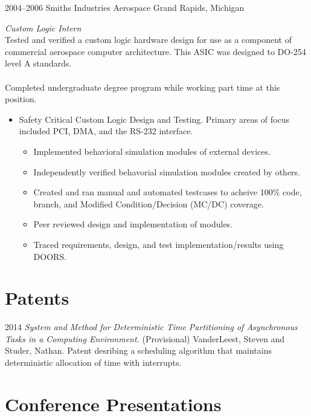\documentclass[print]{template/friggeri-cv} %
\begin{document}
\begin{entrylist}

\longentry
{2004--2006}
{Smiths Industries Aerospace}
{Grand Rapids, Michigan}
{\emph{Custom Logic Intern} \\
Tested and verified a custom logic hardware design for use as a component of commercial aerospace computer architecture.  This ASIC was designed to DO-254 level A standards.  
\\
\\
Completed undergraduate degree program while working part time at this position.
\begin{itemize}
\item Safety Critical Custom Logic Design and Testing.  Primary areas of focus included PCI, DMA, and the RS-232 interface.
\begin{itemize}
\item Implemented behavioral simulation modules of external devices.
\item Independently verified behavorial simulation modules created by others.
\item Created and ran manual and automated testcases to acheive 100\% code, branch, and Modified Condition/Decision (MC/DC) coverage.
\item Peer reviewed design and implementation of modules.
\item Traced requirements, design, and test implementation/results using DOORS.
\end{itemize}
\end{itemize}}

\end{entrylist}

\section{Patents}

\begin{entrylist}
\longentry
{2014}
{\emph{System and Method for Deterministic Time Partitioning of Asynchronous Tasks in a Computing Environment.} (Provisional)}
{VanderLeest, Steven and Studer, Nathan.}
{Patent desribing a scheduling algorithm that maintains deterministic allocation of time with interrupts.}
\end{entrylist}

\section{Conference Presentations}
\end{document}
